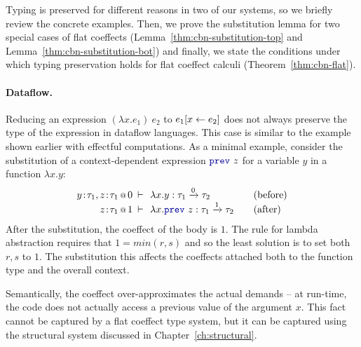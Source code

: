 Typing is preserved for different reasons in two of our systems, so we briefly review the
concrete examples. Then, we prove the substitution lemma for two special cases of flat coeffects
(Lemma~\ref{thm:cbn-substitution-top} and Lemma~\ref{thm:cbn-substitution-bot}) and finally, we
state the conditions under which typing preservation holds for flat coeffect calculi
(Theorem~\ref{thm:cbn-flat}).

\paragraph{Dataflow.}
Reducing an expression $(\lambda x.e_1)~e_2$ to  $e_1[x \leftarrow e_2]$ does not always
preserve the type of the expression in dataflow languages. This case is similar to the example shown
earlier with effectful computations. As a minimal example, consider the substitution of
a context-dependent expression $\kvd{prev}~z$ for a variable $y$ in a function $\lambda x.y$:
%
\begin{equation*}
\begin{array}{rclcl}
 \coctx{y\!:\!\tau_1,z\!:\!\tau_1}{0} &\narrow{\vdash}& \lambda x.y : \tau_1 \xrightarrow{0} \tau_2 & & (\textnormal{before}) \\
 \coctx{z\!:\!\tau_1}{1} &\narrow{\vdash}& \lambda x.\kvd{prev}~z : \tau_1 \xrightarrow{1} \tau_2 & & (\textnormal{after}) \\
\end{array}
\end{equation*}
%
After the substitution, the coeffect of the body is $1$. The rule for lambda abstraction requires
that $1=\mathit{min}(r,s)$ and so the least solution is to set both $r,s$ to $1$. The substitution
this affects the coeffects attached both to the function type and the overall context.

Semantically, the coeffect over-approximates the actual demands -- at run-time, the code does not
actually access a previous value of the argument $x$. This fact cannot be captured by a flat coeffect
type system, but it can be captured using the structural system discussed in Chapter~\ref{ch:structural}.

